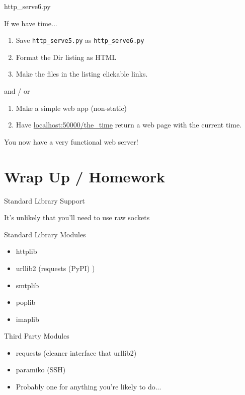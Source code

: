 \documentclass{beamer}
\begin{document}
\begin{frame}[fragile]{http\_serve6.py}

{\Large If we have time...}
\begin{enumerate}
  \item Save \verb|http_serve5.py|  as \verb|http_serve6.py|
  \item Format the Dir listing as HTML
  \item Make the files in the listing clickable links.
\end{enumerate}
 and / or
\begin{enumerate}
  \item Make a simple web app (non-static)
  \item Have \url{localhost:50000/the_time} return a web page with the current time.
\end{enumerate}
\vfill
{\Large You now have a very functional web server!} 
\end{frame}

\section{Wrap Up / Homework}

\begin{frame}[fragile]{Standard Library Support}

{\Large It's unlikely that you'll need to use raw sockets}

\vfill
{\Large Standard Library Modules}
\begin{itemize}
  \item httplib
  \item urllib2 (requests (PyPI) )
  \item smtplib
  \item poplib
  \item imaplib
\end{itemize}

{\Large Third Party Modules}
\begin{itemize}
  \item requests (cleaner interface that urllib2)
  \item paramiko (SSH)
  \item Probably one for anything you're likely to do...
\end{itemize}
  
\end{frame}
\end{document}
